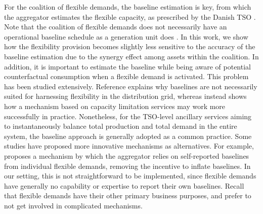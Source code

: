 \documentclass[conference]{IEEEtran}
\begin{document}
For the coalition of flexible demands, the baseline estimation is key, from which the aggregator estimates the flexible capacity, as prescribed by the Danish TSO \cite{energinet:prequalification}. Note that the coalition of flexible demands does not necessarily have an operational baseline schedule as a generation unit does \cite{gade2022ecosystem}.
%
In this work, we show how the flexibility provision becomes slightly less sensitive to the accuracy of the baseline estimation due to the synergy effect among assets within the coalition. 
In addition, it is important to estimate the baseline while being aware of potential counterfactual consumption when a flexible demand is activated. This problem has been studied extensively. Reference \cite{ziras2021baselines} explains why baselines are not necessarily suited for harnessing flexibility in the distribution grid, whereas \cite{capacity_limitation_services} instead shows how a mechanism based on capacity limitation services may work more successfully in practice. Nonetheless, for the TSO-level ancillary services aiming to instantaneously balance total production and total demand in the entire system, the baseline approach is generally adopted as a common practice. Some studies have proposed more innovative mechanisms as alternatives. For example,  \cite{muthirayan2019mechanism} proposes a mechanism by which the aggregator relies on self-reported baselines from individual flexible demands, removing the incentive to inflate baselines. In our setting, this is not straightforward to be implemented, since flexible demands have generally no capability or expertise to report their own baselines. Recall that flexible demands have their other primary business purposes, and prefer to not get involved in complicated mechanisms.



\end{document}
